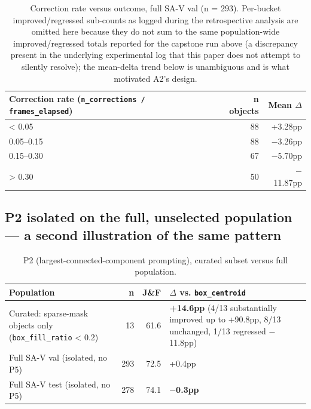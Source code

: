 \documentclass[11pt]{article}
\begin{document}
\begin{table}[!htbp]
\centering
\caption{Correction rate versus outcome, full SA-V val (n = 293). Per-bucket improved/regressed sub-counts as logged during the retrospective analysis are omitted here because they do not sum to the same population-wide improved/regressed totals reported for the capstone run above (a discrepancy present in the underlying experimental log that this paper does not attempt to silently resolve); the mean-delta trend below is unambiguous and is what motivated A2's design.}
\label{tab:6}
\small
\begin{tabularx}{\textwidth}{@{}Lrr@{}}
\toprule
Correction rate (\texttt{n\_corrections / frames\_elapsed}) & n objects & Mean $\Delta$ \\
\midrule
< 0.05 & 88 & +3.28pp \\
0.05–0.15 & 88 & $-$3.26pp \\
0.15–0.30 & 67 & $-$5.70pp \\
> 0.30 & 50 & $-$11.87pp \\
\bottomrule
\end{tabularx}
\end{table}

\subsection{P2 isolated on the full, unselected population — a second illustration of the same pattern}

\begin{table}[!htbp]
\centering
\caption{P2 (largest-connected-component prompting), curated subset versus full population.}
\label{tab:7}
\small
\begin{tabularx}{\textwidth}{@{}LrrL@{}}
\toprule
Population & n & J\&F & $\Delta$ vs. \texttt{box\_centroid} \\
\midrule
Curated: sparse-mask objects only (\texttt{box\_fill\_ratio} < 0.2) & 13 & 61.6 & \textbf{+14.6pp} (4/13 substantially improved up to +90.8pp, 8/13 unchanged, 1/13 regressed $-$11.8pp) \\
Full SA-V val (isolated, no P5) & 293 & 72.5 & +0.4pp \\
Full SA-V test (isolated, no P5) & 278 & 74.1 & \textbf{$-$0.3pp} \\
\bottomrule
\end{tabularx}
\end{table}
\end{document}
